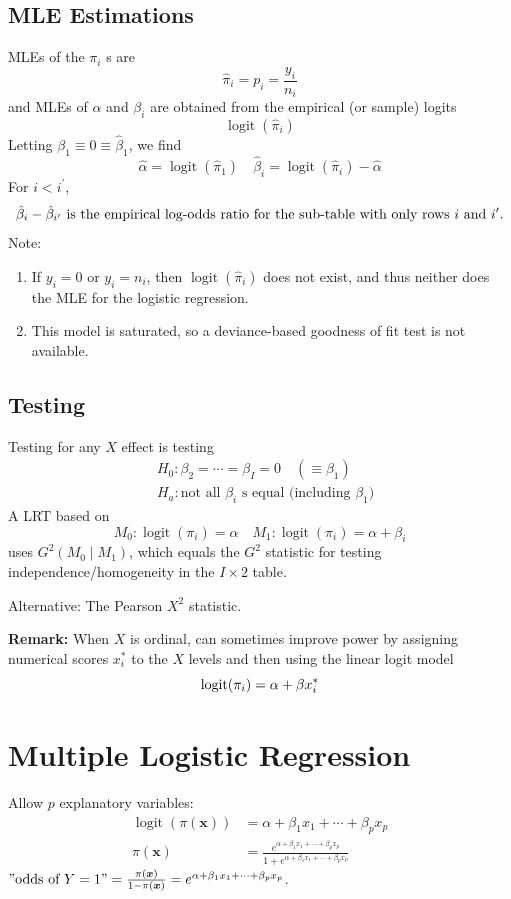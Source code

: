 \documentclass[11pt]{elegantbook}
\begin{document}
\subsection{MLE Estimations}
MLEs of the $\pi_i$ s are
$$
\hat{\pi}_i=p_i=\frac{y_i}{n_i}
$$
and MLEs of $\alpha$ and $\beta_i$ are obtained from the empirical (or sample) logits
$$
\operatorname{logit}\left(\hat{\pi}_i\right)
$$
Letting $\beta_1 \equiv 0 \equiv \hat{\beta}_1$, we find
$$
\hat{\alpha}=\operatorname{logit}\left(\hat{\pi}_1\right) \quad \hat{\beta}_i=\operatorname{logit}\left(\hat{\pi}_i\right)-\hat{\alpha}
$$
For $i<i^{\prime}$,
$$
\hat{\beta}_i-\hat{\beta}_{i^{\prime}}\textnormal{ is the empirical log-odds ratio for the sub-table with only rows $i$ and $i^{\prime}$.}
$$
Note:
\begin{enumerate}[1.]
    \item If $y_i = 0$ or $y_i = n_i$, then $\operatorname{logit}\left(\hat{\pi}_i\right)$ does not exist, and thus neither does the MLE for the logistic regression.
    \item This model is saturated, so a deviance-based goodness of fit test is not available.
\end{enumerate}

\subsection{Testing}
Testing for any $X$ effect is testing
$$
\begin{aligned}
& H_0: \beta_2=\cdots=\beta_I=0 \quad\left(\equiv \beta_1\right) \\
& H_a: \text {not all } \beta_i \text { s equal (including $\beta_1$)}
\end{aligned}
$$
A LRT based on
$$
M_0: \operatorname{logit}\left(\pi_i\right)=\alpha \quad M_1: \operatorname{logit}\left(\pi_i\right)=\alpha+\beta_i
$$
uses $G^2\left(M_0 \mid M_1\right)$, which equals the $G^2$ statistic for testing independence/homogeneity in the $I \times 2$ table.

Alternative: The Pearson $X^2$ statistic.

\textbf{Remark:} When $X$ is ordinal, can sometimes improve power by assigning numerical scores $x_i^*$ to the $X$ levels and then using the linear logit model $$\textnormal{logit}(\pi_i)=\alpha+\beta x_i^*$$

\section{Multiple Logistic Regression}
Allow $p$ explanatory variables:
\begin{equation}
    \begin{aligned}
        \operatorname{logit}(\pi(\boldsymbol{x}))&=\alpha+\beta_1 x_1+\cdots+\beta_p x_p\\
        \pi(\boldsymbol{x})&=\frac{e^{\alpha+\beta_1 x_1+\cdots+\beta_p x_p}}{1+e^{\alpha+\beta_1 x_1+\cdots+\beta_p x_p}}
    \end{aligned}
    \nonumber
\end{equation}
$"\text{odds of } Y=1"=\frac{\pi(\boldsymbol{x})}{1-\pi(\boldsymbol{x})}=e^{\alpha+\beta_1 x_1+\cdots+\beta_p x_p}$.
\end{document}
